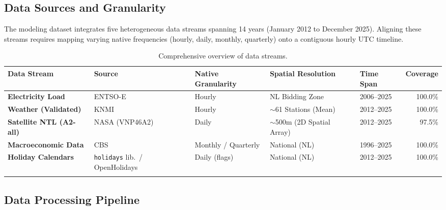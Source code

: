 \subsection{Data Sources and Granularity}
\label{subsec:data_sources}

The modeling dataset integrates five heterogeneous data streams spanning 14 years (January 2012 to December 2025). Aligning these streams requires mapping varying native frequencies (hourly, daily, monthly, quarterly) onto a contiguous hourly UTC timeline.


\begin{table}[htbp]
    \centering
    \scriptsize
    \setlength{\tabcolsep}{2pt}
    \caption{Comprehensive overview of data streams.}
    \label{tab:data_sources_full}
    \begin{tabularx}{\columnwidth}{@{} >{\raggedright\arraybackslash}X l >{\raggedright\arraybackslash}X >{\raggedright\arraybackslash}X l r @{}}
        \toprule
        \textbf{Data Stream} & \textbf{Source} & \textbf{Native Granularity} & \textbf{Spatial Resolution} & \textbf{Time Span} & \textbf{Coverage} \\
        \midrule
        \textbf{Electricity Load} & ENTSO-E & Hourly & NL Bidding Zone & 2006--2025 & 100.0\% \\
        \textbf{Weather (Validated)} & KNMI & Hourly & $\sim$61 Stations (Mean) & 2012--2025 & 100.0\% \\
        \textbf{Satellite NTL (A2-all)} & NASA (VNP46A2) & Daily & $\sim$500m (2D Spatial Array) & 2012--2025 & 97.5\% \\
        \textbf{Macroeconomic Data} & CBS & Monthly / Quarterly & National (NL) & 1996--2025 & 100.0\% \\
        \textbf{Holiday Calendars} & \texttt{holidays} lib.\ / OpenHolidays & Daily (flags) & National (NL) & 2012--2025 & 100.0\% \\
        \bottomrule
        \multicolumn{6}{@{}p{\columnwidth}@{}}{\vspace{1pt}}
    \end{tabularx}
\end{table}


\subsection{Data Processing Pipeline}
\label{subsec:data_processing}

